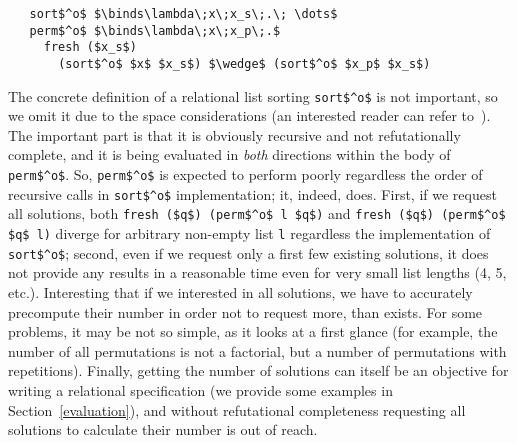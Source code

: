 \begin{lstlisting}
   sort$^o$ $\binds\lambda\;x\;x_s\;.\; \dots$
   perm$^o$ $\binds\lambda\;x\;x_p\;.$
     fresh ($x_s$) 
       (sort$^o$ $x$ $x_s$) $\wedge$ (sort$^o$ $x_p$ $x_s$) 
\end{lstlisting}

The concrete definition of a relational list sorting \lstinline|sort$^o$| is not important, so we
omit it due to the space considerations (an interested reader can refer to~\cite{OCanren}). The important part 
is that it is obviously recursive and not refutationally complete, and it is being evaluated 
in \emph{both} directions within the body of \lstinline|perm$^o$|. So, \lstinline|perm$^o$| is expected 
to perform poorly regardless the order of recursive calls in \lstinline|sort$^o$| implementation; it, 
indeed, does. First, if we request all solutions, both \lstinline|fresh ($q$) (perm$^o$ l $q$)| and \lstinline|fresh ($q$) (perm$^o$ $q$ l)| diverge for arbitrary non-empty list \lstinline|l| regardless the implementation of \lstinline|sort$^o$|; second, even if we request only a first few existing solutions, it does not provide any results in a reasonable time even for very small list lengths (4, 5, etc.). Interesting that if we interested in all solutions,
we have to accurately precompute their number in order not to request more, than exists. For some problems,
it may be not so simple, as it looks at a first glance (for example, the number of all permutations is
not a factorial, but a number of permutations with repetitions). Finally, getting the number of solutions can 
itself be an objective for writing a relational specification (we provide some examples in Section~\ref{evaluation}),
and without refutational completeness requesting all solutions to calculate their number is out of
reach.
